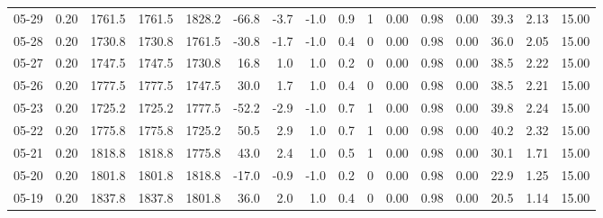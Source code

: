 \begin{threeparttable}
{\begin{tabular}{lrrrrrrrrrrrrrrr}
  05-29 &     0.20 & 1761.5 & 1761.5 & 1828.2 &      -66.8 &           -3.7 &                     -1.0 &                 0.9 &              1 &       0.00 &      0.98 &           0.00 &             39.3 &            2.13 &                  15.00 \\
  05-28 &     0.20 & 1730.8 & 1730.8 & 1761.5 &      -30.8 &           -1.7 &                     -1.0 &                 0.4 &              0 &       0.00 &      0.98 &           0.00 &             36.0 &            2.05 &                  15.00 \\
  05-27 &     0.20 & 1747.5 & 1747.5 & 1730.8 &       16.8 &            1.0 &                      1.0 &                 0.2 &              0 &       0.00 &      0.98 &           0.00 &             38.5 &            2.22 &                  15.00 \\
  05-26 &     0.20 & 1777.5 & 1777.5 & 1747.5 &       30.0 &            1.7 &                      1.0 &                 0.4 &              0 &       0.00 &      0.98 &           0.00 &             38.5 &            2.21 &                  15.00 \\
  05-23 &     0.20 & 1725.2 & 1725.2 & 1777.5 &      -52.2 &           -2.9 &                     -1.0 &                 0.7 &              1 &       0.00 &      0.98 &           0.00 &             39.8 &            2.24 &                  15.00 \\
  05-22 &     0.20 & 1775.8 & 1775.8 & 1725.2 &       50.5 &            2.9 &                      1.0 &                 0.7 &              1 &       0.00 &      0.98 &           0.00 &             40.2 &            2.32 &                  15.00 \\
  05-21 &     0.20 & 1818.8 & 1818.8 & 1775.8 &       43.0 &            2.4 &                      1.0 &                 0.5 &              1 &       0.00 &      0.98 &           0.00 &             30.1 &            1.71 &                  15.00 \\
  05-20 &     0.20 & 1801.8 & 1801.8 & 1818.8 &      -17.0 &           -0.9 &                     -1.0 &                 0.2 &              0 &       0.00 &      0.98 &           0.00 &             22.9 &            1.25 &                  15.00 \\
  05-19 &     0.20 & 1837.8 & 1837.8 & 1801.8 &       36.0 &            2.0 &                      1.0 &                 0.4 &              0 &       0.00 &      0.98 &           0.00 &             20.5 &            1.14 &                  15.00 \\

\end{tabular}}
\end{threeparttable}
